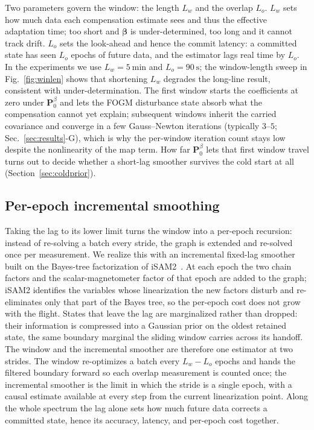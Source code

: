 \documentclass{IEEEtaes}
\begin{document}
Two parameters govern the window: the length $L_w$ and the overlap $L_o$. $L_w$ sets
how much data each compensation estimate sees and thus the effective adaptation
time; too short and $\boldsymbol{\beta}$ is under-determined, too long and it cannot
track drift. $L_o$ sets the look-ahead and hence the commit latency: a committed
state has seen $L_o$ epochs of future data, and the estimator lags real time by
$L_o$. In the experiments we use $L_w=\SI{5}{\minute}$ and $L_o=\SI{90}{\second}$; the
window-length sweep in Fig.~\ref{fig:winlen} shows that shortening $L_w$ degrades
the long-line result, consistent with under-determination. The first window starts the
coefficients at zero under $\mathbf{P}_0^{\beta}$ and lets the FOGM disturbance state
absorb what the compensation cannot yet explain; subsequent windows inherit the
carried covariance and converge in a few Gauss--Newton iterations
(typically $3$--$5$; Sec.~\ref{sec:results}-G), which is why the per-window
iteration count stays low despite the nonlinearity of the map term. How far
$\mathbf{P}_0^{\beta}$ lets that first window travel turns out to decide whether a
short-lag smoother survives the cold start at all (Section~\ref{sec:coldprior}).

\subsection{Per-epoch incremental smoothing}\label{sec:incremental}
Taking the lag to its lower limit turns the window into a per-epoch recursion: instead
of re-solving a batch every stride, the graph is extended and re-solved once per
measurement. We realize this with an incremental fixed-lag smoother built on the
Bayes-tree factorization of iSAM2~\cite{kaess2012}. At each epoch the two chain
factors and the scalar-magnetometer factor of that epoch are added to the graph;
iSAM2 identifies the variables whose linearization the new factors disturb and
re-eliminates only that part of the Bayes tree, so the per-epoch cost does not grow
with the flight. States that leave the lag are marginalized rather than dropped: their
information is compressed into a Gaussian prior on the oldest retained state, the same
boundary marginal the sliding window carries across its handoff. The window and the
incremental smoother are therefore one estimator at two strides. The window
re-optimizes a batch every $L_w-L_o$ epochs and hands the filtered boundary forward so
each overlap measurement is counted once; the incremental smoother is the limit in
which the stride is a single epoch, with a causal estimate available at every step
from the current linearization point. Along the whole spectrum the lag alone sets how
much future data corrects a committed state, hence its accuracy, latency, and
per-epoch cost together.
\end{document}
